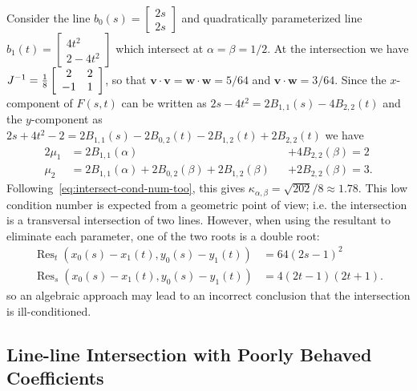 \documentclass[3p, authoryear, square]{elsarticle}
\theoremstyle{definition}
\begin{document}
Consider the line
\(b_0(s) = \left[ \begin{array}{c} 2s \\ 2s \end{array}\right]\)
and quadratically parameterized line
\(b_1(t) = \left[ \begin{array}{c} 4t^2 \\ 2 - 4t^2
\end{array}\right]\) which intersect at \(\alpha = \beta = 1/2\).
At the intersection we have \(J^{-1} = \frac{1}{8}
\left[ \begin{array}{c c} 2 & 2 \\ -1 & 1 \end{array}\right]\),
so that \(\bm{v} \cdot \bm{v} = \bm{w} \cdot \bm{w} =
5/64\) and \(\bm{v} \cdot \bm{w} = 3/64\). Since the
\(x\)-component of \(F(s, t)\) can be written as
\(2s - 4t^2 = 2 B_{1, 1}(s) - 4 B_{2, 2}(t)\) and the
\(y\)-component as \(2s + 4t^2 - 2 = 2 B_{1, 1}(s) - 2 B_{0, 2}(t)
- 2 B_{1, 2}(t) + 2 B_{2, 2}(t)\) we have
\begin{alignat}{2}
\mu_1 &= 2 B_{1, 1}(\alpha) &&+ 4 B_{2, 2}(\beta) = 2 \\
\mu_2 &= 2 B_{1, 1}(\alpha) + 2 B_{0, 2}(\beta) +
  2 B_{1, 2}(\beta) &&+ 2 B_{2, 2}(\beta) = 3.
\end{alignat}
Following~\eqref{eq:intersect-cond-num-too}, this gives
\(\kappa_{\alpha, \beta} = \sqrt{202}/8 \approx 1.78\).
This low condition number is expected from a geometric point of view; i.e.
the intersection is a transversal intersection of two lines. However,
when using the resultant to eliminate each parameter, one of the two roots is
a double root:
\begin{align}
\operatorname{Res}_t\left(x_0(s) - x_1(t), y_0(s) - y_1(t)\right) &=
  64(2s - 1)^2 \\
\operatorname{Res}_s\left(x_0(s) - x_1(t), y_0(s) - y_1(t)\right) &=
  4(2t - 1)(2t + 1).
\end{align}
so an algebraic approach may lead to an incorrect conclusion that the
intersection is ill-conditioned.

\subsection{Line-line Intersection with Poorly Behaved Coefficients}
\end{document}
